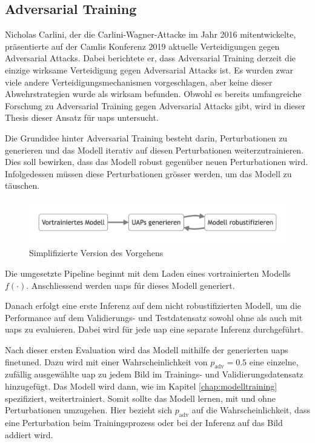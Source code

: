 \subsection{Adversarial Training} \label{chap:adversarial training}
Nicholas Carlini, der die Carlini-Wagner-Attacke \cite{carlini_towards_2017} im Jahr 2016 mitentwickelte, präsentierte auf der Camlis Konferenz 2019 \cite[19:15]{camlis_evaluating_2019} aktuelle Verteidigungen gegen Adversarial Attacks. Dabei berichtete er, dass Adversarial Training derzeit die einzige wirksame Verteidigung gegen Adversarial Attacks ist. Es wurden zwar viele andere Verteidigungsmechanismen vorgeschlagen, aber keine dieser Abwehrstrategien wurde als wirksam befunden. Obwohl es bereits umfangreiche Forschung zu Adversarial Training gegen Adversarial Attacks gibt, wird in dieser Thesis dieser Ansatz für \acrlong{uap}s untersucht.

Die Grundidee hinter Adversarial Training besteht darin, Perturbationen zu generieren und das Modell iterativ auf diesen Perturbationen weiterzutrainieren. Dies soll bewirken, dass das Modell robust gegenüber neuen Perturbationen wird. Infolgedessen müssen diese Perturbationen grösser werden, um das Modell zu täuschen. 

\begin{figure}[H]
    \centering
    \includegraphics[width=\linewidth]{01-images/04-methodik/simplified_overview.png}
    \caption{Simplifizierte Version des Vorgehens}
    \label{fig:07-simplified_overview}
\end{figure}

Die umgesetzte Pipeline beginnt mit dem Laden eines vortrainierten Modells $f(\cdot)$. Anschliessend werden \acrshort{uap}s für dieses Modell generiert. 

Danach erfolgt eine erste Inferenz auf dem nicht robustifizierten Modell, um die Performance auf dem Validierungs- und Testdatensatz sowohl ohne als auch mit \acrshort{uap}s zu evaluieren. Dabei wird für jede \acrshort{uap} eine separate Inferenz durchgeführt.

Nach dieser ersten Evaluation wird das Modell mithilfe der generierten \acrshort{uap}s finetuned. Dazu wird mit einer Wahrscheinlichkeit von $p_{\text{adv}} = 0.5$ eine einzelne, zufällig ausgewählte \acrshort{uap} zu jedem Bild im Trainings- und Validierungsdatensatz hinzugefügt. Das Modell wird dann, wie im Kapitel \ref{chap:modelltraining} spezifiziert, weitertrainiert. Somit sollte das Modell lernen, mit und ohne Perturbationen umzugehen. Hier bezieht sich $p_{\text{adv}}$ auf die Wahrscheinlichkeit, dass eine Perturbation beim Trainingsprozess oder bei der Inferenz auf das Bild addiert wird. 

